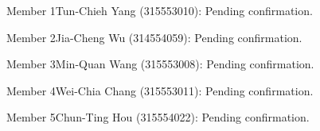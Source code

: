 \item \ifdefined\JUDGE Member 1\else Tun-Chieh Yang (315553010)\fi: Pending confirmation.
\item \ifdefined\JUDGE Member 2\else Jia-Cheng Wu (314554059)\fi: Pending confirmation.
\item \ifdefined\JUDGE Member 3\else Min-Quan Wang (315553008)\fi: Pending confirmation.
\item \ifdefined\JUDGE Member 4\else Wei-Chia Chang (315553011)\fi: Pending confirmation.
\item \ifdefined\JUDGE Member 5\else Chun-Ting Hou (315554022)\fi: Pending confirmation.
